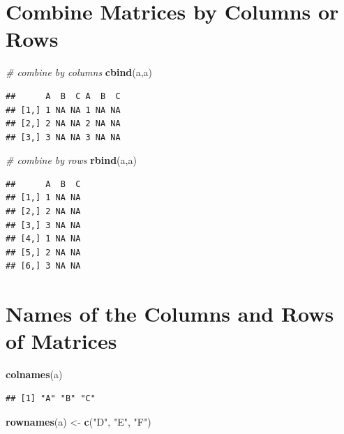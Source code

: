 \documentclass[]{book}
\newenvironment{Shaded}{\begin{snugshade}}{\end{snugshade}}
\newcommand{\CommentTok}[1]{\textcolor[rgb]{0.56,0.35,0.01}{\textit{#1}}}
\newcommand{\KeywordTok}[1]{\textcolor[rgb]{0.13,0.29,0.53}{\textbf{#1}}}
\newcommand{\NormalTok}[1]{#1}
\newcommand{\StringTok}[1]{\textcolor[rgb]{0.31,0.60,0.02}{#1}}
\begin{document}
\hypertarget{combine-matrices-by-columns-or-rows}{%
\section{Combine Matrices by Columns or Rows}\label{combine-matrices-by-columns-or-rows}}

\begin{Shaded}
\begin{Highlighting}[]
\CommentTok{# combine by columns}
\KeywordTok{cbind}\NormalTok{(a,a)   }
\end{Highlighting}
\end{Shaded}

\begin{verbatim}
##      A  B  C A  B  C
## [1,] 1 NA NA 1 NA NA
## [2,] 2 NA NA 2 NA NA
## [3,] 3 NA NA 3 NA NA
\end{verbatim}

\begin{Shaded}
\begin{Highlighting}[]
\CommentTok{# combine by rows}
\KeywordTok{rbind}\NormalTok{(a,a)   }
\end{Highlighting}
\end{Shaded}

\begin{verbatim}
##      A  B  C
## [1,] 1 NA NA
## [2,] 2 NA NA
## [3,] 3 NA NA
## [4,] 1 NA NA
## [5,] 2 NA NA
## [6,] 3 NA NA
\end{verbatim}

\hypertarget{names-of-the-columns-and-rows-of-matrices}{%
\section{Names of the Columns and Rows of Matrices}\label{names-of-the-columns-and-rows-of-matrices}}

\begin{Shaded}
\begin{Highlighting}[]
\KeywordTok{colnames}\NormalTok{(a) }
\end{Highlighting}
\end{Shaded}

\begin{verbatim}
## [1] "A" "B" "C"
\end{verbatim}

\begin{Shaded}
\begin{Highlighting}[]
\KeywordTok{rownames}\NormalTok{(a) <-}\StringTok{ }\KeywordTok{c}\NormalTok{(}\StringTok{"D"}\NormalTok{, }\StringTok{"E"}\NormalTok{, }\StringTok{"F"}\NormalTok{)}
\end{Highlighting}
\end{Shaded}
\end{document}
